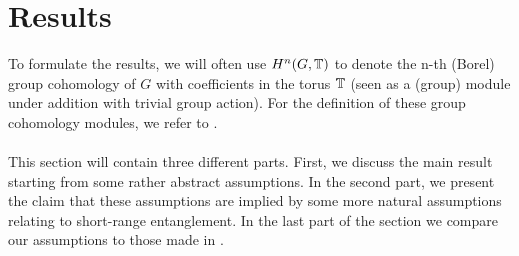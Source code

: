 \documentclass[11pt,a4paper,twoside]{article}
\numberwithin{equation}{section}
\begin{document}
	\section{Results}
	To formulate the results, we will often use $H^n(G,\mathbb T)$ to denote the n-th (Borel) group cohomology of $G$ with coefficients in the torus $\mathbb T$ (seen as a (group) module under addition with trivial group action). For the definition of these group cohomology modules, we refer to \cite{benson1991representations}.
	\\\\
	This section will contain three different parts. First, we discuss the main result starting from some rather abstract assumptions. In the second part, we present the claim that these assumptions are implied by some more natural assumptions relating to short-range entanglement. In the last part of the section we compare our assumptions to those made in \cite{ogata2021h3gmathbb}.
\end{document}

